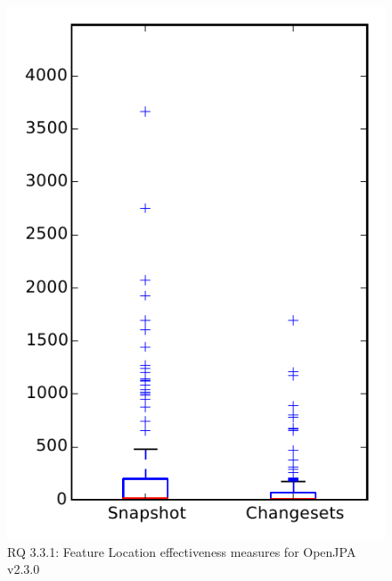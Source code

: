 
\begin{figure}
\centering
\includegraphics[height=0.4\textheight]{figures/flt/rq1_openjpa}
\caption{RQ 3.3.1: Feature Location effectiveness measures for OpenJPA v2.3.0}
\label{fig:flt:rq1:openjpa}
\end{figure}
